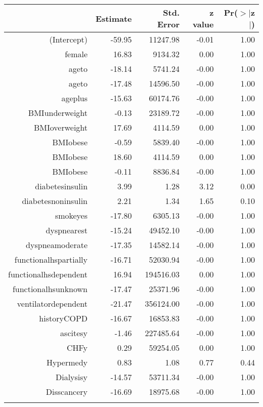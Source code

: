 \bigskip\bigskip
\centering
\begin{tabular}{rrrrr}
  \hline
 & Estimate & Std. Error & z value & Pr($>$$|$z$|$) \\ 
  \hline
(Intercept) & -59.95 & 11247.98 & -0.01 & 1.00 \\ 
  female & 16.83 & 9134.32 & 0.00 & 1.00 \\ 
  age\-65\-to\-74 & -18.14 & 5741.24 & -0.00 & 1.00 \\ 
  age\-75\-to\-84 & -17.48 & 14596.50 & -0.00 & 1.00 \\ 
  age\-85\-plus & -15.63 & 60174.76 & -0.00 & 1.00 \\ 
  BMI\-underweight & -0.13 & 23189.72 & -0.00 & 1.00 \\ 
  BMI\-overweight & 17.69 & 4114.59 & 0.00 & 1.00 \\ 
  BMI\-obese\-1 & -0.59 & 5839.40 & -0.00 & 1.00 \\ 
  BMI\-obese\-2 & 18.60 & 4114.59 & 0.00 & 1.00 \\ 
  BMI\-obese\-3 & -0.11 & 8836.84 & -0.00 & 1.00 \\ 
  diabetes\-insulin & 3.99 & 1.28 & 3.12 & 0.00 \\ 
  diabetes\-noninsulin & 2.21 & 1.34 & 1.65 & 0.10 \\ 
  smoke\-yes & -17.80 & 6305.13 & -0.00 & 1.00 \\ 
  dyspnea\-rest & -15.24 & 49452.10 & -0.00 & 1.00 \\ 
  dyspnea\-moderate & -17.35 & 14582.14 & -0.00 & 1.00 \\ 
  functional\-hs\-partially & -16.71 & 52030.94 & -0.00 & 1.00 \\ 
  functional\-hs\-dependent & 16.94 & 194516.03 & 0.00 & 1.00 \\ 
  functional\-hs\-unknown & -17.47 & 25371.96 & -0.00 & 1.00 \\ 
  ventilator\-dependent & -21.47 & 356124.00 & -0.00 & 1.00 \\ 
  history\-COPD & -16.67 & 16853.83 & -0.00 & 1.00 \\ 
  ascites\-y & -1.46 & 227485.64 & -0.00 & 1.00 \\ 
  CHF\-y & 0.29 & 59254.05 & 0.00 & 1.00 \\ 
  Hyper\-med\-y & 0.83 & 1.08 & 0.77 & 0.44 \\ 
  Dialysis\-y & -14.57 & 53711.34 & -0.00 & 1.00 \\ 
  Diss\-cancer\-y & -16.69 & 18975.68 & -0.00 & 1.00 \\ 
$$
\end{tabular}
